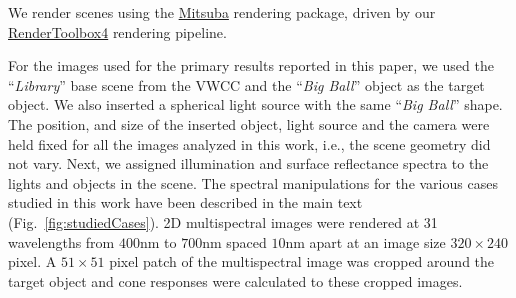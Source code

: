 \documentclass{jov}
\begin{document}
We render scenes using the \href{https://www.mitsuba-renderer.org}{Mitsuba} \cite{jakob2015mitsuba} rendering package, driven by our \href{http://rendertoolbox.org}{RenderToolbox4} \cite{heasly2014rendertoolbox3} rendering pipeline.

For the images used for the primary results reported in this paper, we used the ``{\it Library}'' base scene from the VWCC  and the ``{\it Big Ball}'' object as the target object. We also inserted a spherical light source with the same ``{\it Big Ball}'' shape. The position, and size of the inserted object, light source and the camera were held fixed for all the images analyzed in this work, i.e., the scene geometry did not vary. Next, we assigned illumination and surface reflectance spectra to the lights and objects in the scene. The spectral manipulations for the various cases studied in this work have been described in the main text (Fig.~\ref{fig:studiedCases}). 2D multispectral images were rendered at 31 wavelengths from $400$nm to $700$nm spaced $10$nm apart at an image size $320\times 240$ pixel. A $51 \times 51$ pixel patch of the multispectral image was cropped around the target object and cone responses were calculated to these cropped images. 
\end{document}
